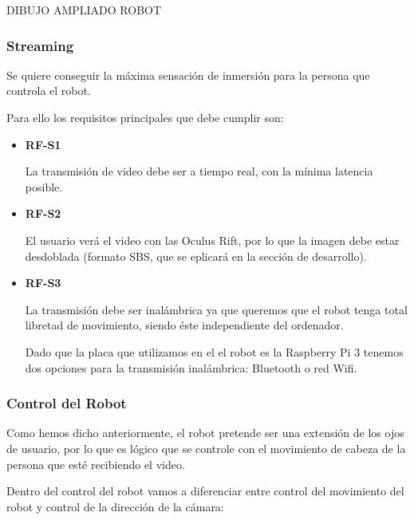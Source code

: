 \documentclass[twoside, 12pt]{epstfg}
\begin{document}
DIBUJO AMPLIADO ROBOT

\subsubsection{Streaming}

Se quiere conseguir la máxima sensación de inmersión para la persona que controla el robot.

Para ello los requisitos principales que debe cumplir son:

\begin{itemize}
	\item\textbf{RF-S1}
	
	La transmisión de video debe ser  a tiempo real, con la mínima latencia posible.
	
	\item\textbf{RF-S2}
	
	El usuario verá el video con  las Oculus Rift, por lo que la imagen debe estar desdoblada (formato SBS, que se eplicará en la sección de desarrollo).
	
	\item\textbf{RF-S3}
	
	La transmisión debe ser inalámbrica ya que queremos que el robot tenga total libretad de movimiento, siendo éste independiente del ordenador.
	
	
	Dado que la placa que utilizamos en el el robot es la Raspberry Pi 3 tenemos dos opciones para la transmisión inalámbrica: Bluetooth o red Wifi.
	
\end{itemize}



\subsubsection{Control del Robot}

Como hemos dicho anteriormente, el robot pretende ser una extensión de los ojos de usuario, por lo que es lógico que se controle con el movimiento de cabeza de la persona que esté recibiendo el video.

Dentro del control del robot vamos a diferenciar entre control del movimiento del robot y control de la dirección de la cámara:
\end{document}
